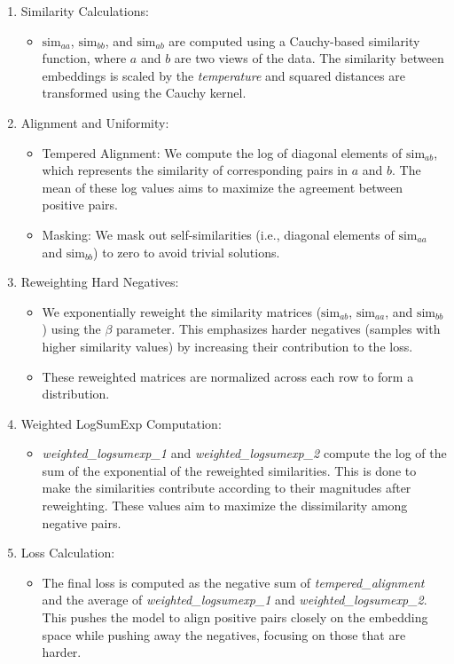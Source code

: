 \begin{enumerate}
  \item {Similarity Calculations}:
  \begin{itemize}
    \item \( \text{sim}_{aa} \), \( \text{sim}_{bb} \), and \( \text{sim}_{ab} \) are computed using a Cauchy-based similarity function, where \(a\) and \(b\) are two views of the data. The similarity between embeddings is scaled by the \textit{temperature} and squared distances are transformed using the Cauchy kernel. 
  \end{itemize}

  \item {Alignment and Uniformity}:
  \begin{itemize}
    \item {Tempered Alignment}: We compute the log of diagonal elements of \( \text{sim}_{ab} \), which represents the similarity of corresponding pairs in \(a\) and \(b\). The mean of these log values aims to maximize the agreement between positive pairs.
    \item {Masking}: We mask out self-similarities (i.e., diagonal elements of \( \text{sim}_{aa} \) and \( \text{sim}_{bb} \)) to zero to avoid trivial solutions.
  \end{itemize}

  \item {Reweighting Hard Negatives}:
  \begin{itemize}
    \item We exponentially reweight the similarity matrices (\( \text{sim}_{ab} \), \( \text{sim}_{aa} \), and \( \text{sim}_{bb} \)) using the \( \beta \) parameter. This emphasizes harder negatives (samples with higher similarity values) by increasing their contribution to the loss.
    \item These reweighted matrices are normalized across each row to form a distribution.
  \end{itemize}

   \item {Weighted LogSumExp Computation}:
  \begin{itemize}
    \item \textit{weighted\_logsumexp\_1} and \textit{weighted\_logsumexp\_2} compute the log of the sum of the exponential of the reweighted similarities. This is done to make the similarities contribute according to their magnitudes after reweighting. These values aim to maximize the dissimilarity among negative pairs.
  \end{itemize}

  \item {Loss Calculation}:
  \begin{itemize}
    \item The final loss is computed as the negative sum of \textit{tempered\_alignment} and the average of \textit{weighted\_logsumexp\_1} and \textit{weighted\_logsumexp\_2}. This pushes the model to align positive pairs closely on the embedding space while pushing away the negatives, focusing on those that are harder.
  \end{itemize}
\end{enumerate}


